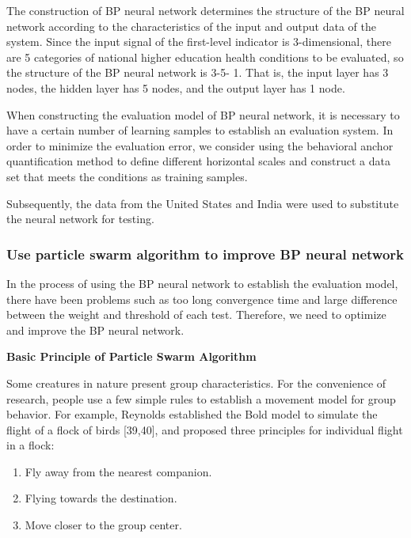 \documentclass[12pt]{article}  %
\begin{document}
The construction of BP neural network determines the structure of the BP neural network according to the characteristics of the input and output data of the system. Since the input signal of the first-level indicator is 3-dimensional, there are 5 categories of national higher education health conditions to be evaluated, so the structure of the BP neural network is 3-5- 1. That is, the input layer has 3 nodes, the hidden layer has 5 nodes, and the output layer has 1 node.

When constructing the evaluation model of BP neural network, it is necessary to have a certain number of learning samples to establish an evaluation system. In order to minimize the evaluation error, we consider using the behavioral anchor quantification method to define different horizontal scales and construct a data set that meets the conditions as training samples.

Subsequently, the data from the United States and India were used to substitute the neural network for testing.

\subsubsection{Use particle swarm algorithm to improve BP neural network }

In the process of using the BP neural network to establish the evaluation model, there have been problems such as too long convergence time and large difference between the weight and threshold of each test. Therefore, we need to optimize and improve the BP neural network.

\textbf{Basic Principle of Particle Swarm Algorithm}

Some creatures in nature present group characteristics. For the convenience of research, people use a few simple rules to establish a movement model for group behavior. For example, Reynolds established the Bold model to simulate the flight of a flock of birds [39,40], and proposed three principles for individual flight in a flock:

\begin{enumerate}[\bfseries 1.]
    \item Fly away from the nearest companion.
    \item Flying towards the destination. 
    \item Move closer to the group center.

\end{enumerate}
\end{document}
